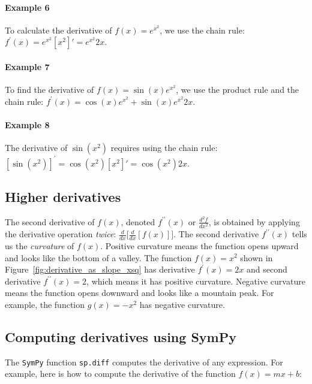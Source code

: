 		\paragraph{Example 6}
			To calculate the derivative of $f(x) = e^{x^2}$,
			we use the chain rule:
			$f^{\prime\!}(x) = e^{x^2}[x^2]'  = e^{x^2}2x$.

		\paragraph{Example 7}
			To find the derivative of $f(x) = \sin(x)e^{x^2}$,
			we use the product rule and the chain rule:
			$f^{\prime\!}(x) = \cos(x)e^{x^2} + \sin(x)e^{x^2}2x$.

		\paragraph{Example 8}
			The derivative of $\sin(x^2)$ requires using the chain rule:
			$\left[ \sin(x^2) \right]^\prime =  \cos(x^2)\left[x^2\right]' =  \cos(x^2)2x$.




	\subsection{Higher derivatives}

		The second derivative of $f(x)$,
		denoted $f^{\prime\prime\!}(x)$ or $\frac{d^2f}{dx^2}$,
		is obtained by applying the derivative operation \emph{twice}:
		$\frac{d}{dx}\big[ \frac{d}{dx}[f(x)] \big]$.
		The second derivative $f^{\prime\prime\!}(x)$
		tells us the \emph{curvature} of $f(x)$.
		Positive curvature means the function opens upward
		and looks like the bottom of a valley.
		The function $f(x)=x^2$ shown in Figure~\ref{fig:derivative_as_slope_xsq} 
		has derivative $f^{\prime\!}(x) = 2x$ and second derivative $f^{\prime\prime\!}(x) = 2$,
		which means it has positive curvature.
		Negative curvature means the function opens downward
		and looks like a mountain peak.
		For example,
		the function $g(x) = -x^2$ has negative curvature.




	\subsection{Computing derivatives using SymPy}

		The \texttt{SymPy} function \texttt{sp.diff} computes the derivative of any expression.
		For example,
		here is how to compute the derivative of the function $f(x) = mx + b$:

